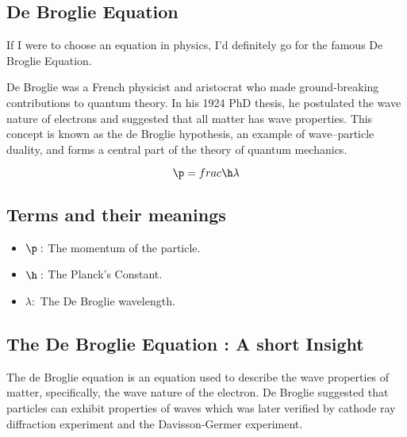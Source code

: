 \subsection{De Broglie Equation}

{

If I were to choose an equation in physics, I’d definitely go for the famous De Broglie Equation.

De Broglie was a French physicist and aristocrat who made ground-breaking contributions to quantum theory. In his 1924 PhD thesis, he postulated the wave nature of electrons and suggested that all matter has wave properties. This concept is known as the de Broglie hypothesis, an example of wave–particle duality, and forms a central part of the theory of quantum mechanics.

\begin{equation}

\p = frac{\h}{\lambda}

\label{De Broglie Equation}

\end{equation}

}

\subsection{Terms and their meanings}

{

\begin{itemize}

\item $\p :$ The momentum of the particle.

\item $\h :$ The Planck’s Constant.

\item $\lambda :$ The De Broglie wavelength.

\end{itemize}

}

\subsection{The De Broglie Equation : A short Insight}

{

The de Broglie equation is an equation used to describe the wave properties of matter, specifically, the wave nature of the electron. De Broglie suggested that particles can exhibit properties of waves which was later verified by cathode ray diffraction experiment and the Davisson-Germer experiment.

}
